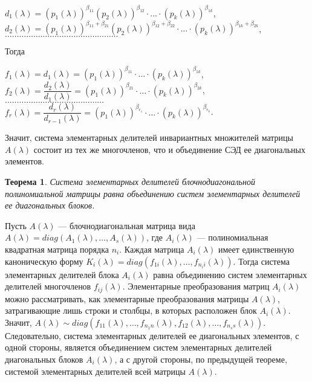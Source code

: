 \begin{Proof}
\begin{center}
		$d_1(\lambda) = (p_1(\lambda))^{\beta_{11}} (p_2(\lambda))^{\beta_{12}}\cdot \ldots \cdot (p_k(\lambda))^{\beta_{1k}}$,\\
		$d_2(\lambda) = (p_1(\lambda))^{\beta_{11} + \beta_{21}} (p_2(\lambda))^{\beta_{12} + \beta_{22}} \cdot \ldots \cdot (p_k(\lambda))^{\beta_{1k} + \beta_{2k}}$,\\
		$\dots\dots\dots\dots\dots\dots\dots\dots\dots\dots\dots\dots\dots\dots\dots\dots$\\
	\end{center}
	Тогда \begin{center}
		$f_1(\lambda) = d_1(\lambda) = (p_1(\lambda))^{\beta_{11}}\cdot \ldots\cdot (p_k(\lambda))^{\beta_{1k}}$,\\
		$f_2(\lambda) = \dfrac {d_2(\lambda)}{d_1(\lambda)} = (p_1(\lambda))^{\beta_{21}} \cdot\ldots\cdot (p_k(\lambda))^{\beta_{2k}}$,\\
		$\dots\dots\dots\dots\dots\dots\dots\dots\dots\dots\dots\dots\dots\dots$\\
		$f_r(\lambda) = \dfrac {d_r(\lambda)}{d_{r-1}(\lambda)} = (p_1(\lambda))^{\beta_{r_1}} \cdot\ldots\cdot (p_k(\lambda))^{\beta_{r_k}}$.
	\end{center}
	Значит, система элементарных делителей инвариантных множителей матрицы $A(\lambda)$ состоит из тех же многочленов, что и объединение СЭД ее диагональных элементов.
\end{Proof} 
\newtheorem*{th12_3_3}{Теорема}\begin{th12_3_3}Система элементарных делителей блочнодиагональной полиномиальной матрицы равна объединению систем элементарных делителей ее диагональных блоков.
\end{th12_3_3}
\begin{Proof}
	Пусть $A(\lambda)$ --- блочнодиагональная матрица вида $A(\lambda) = diag (A_1(\lambda), \dots, A_s(\lambda))$, где $A_i(\lambda)$ --- полиномиальная квадратная матрица порядка $n_i$. Каждая матрица $A_i(\lambda)$ имеет единственную каноническую форму $K_i(\lambda) = diag (f_{1i}(\lambda), \dots, f_{n_ii}(\lambda)).$ Тогда система элементарных делителей блока $A_i(\lambda)$ равна объединению систем элементарных делителей многочленов $f_{ij}(\lambda)$. Элементарные преобразования матриц $A_i(\lambda)$ можно рассматривать, как элементарные преобразования матрицы $A(\lambda)$, затрагивающие лишь строки и столбцы, в которых расположен блок $A_i(\lambda)$. Значит, $A(\lambda) \sim diag(f_{11}(\lambda),\dots,f_{n_1n}(\lambda),f_{12}(\lambda),\dots,f_{n_ss}(\lambda))$. Следовательно, система элементарных делителей ее диагональных элементов, с одной стороны, является объединением систем элементарных делителей диагональных блоков $A_i(\lambda)$, а с другой стороны, по предыдущей теореме, системой элементарных делителей всей матрицы $A(\lambda)$.
\end{Proof}










